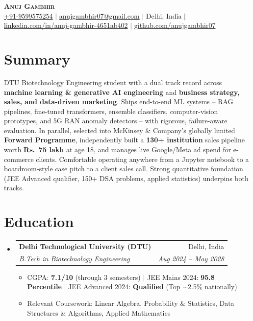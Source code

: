 \documentclass[letterpaper,10.5pt]{article}
\makeatletter
\newcommand{\resumeItem}[1]{
  \item\small{#1 \vspace{-2pt}}
}
\newcommand{\resumeSubheading}[4]{
  \vspace{-2pt}\item
    \begin{tabular*}{0.97\textwidth}[t]{l@{\extracolsep{\fill}}r}
      \textbf{#1} & \small #2 \\
      \textit{\small#3} & \textit{\small #4} \\
    \end{tabular*}\vspace{-5pt}
}
\newcommand{\resumeSubHeadingListStart}{\begin{itemize}[leftmargin=0.12in, label={}]}
\newcommand{\resumeSubHeadingListEnd}{\end{itemize}}
\newcommand{\resumeItemListStart}{\begin{itemize}[leftmargin=0.18in]}
\newcommand{\resumeItemListEnd}{\end{itemize}\vspace{-4pt}}
\makeatother
\begin{document}
\begin{center}
    {\LARGE \scshape \textbf{Anuj Gambhir}} \\ \vspace{3pt}
    \small
    \href{tel:9599575254}{+91-9599575254} $|$
    \href{mailto:anujgambhir07@gmail.com}{anujgambhir07@gmail.com} $|$
    Delhi, India $|$
    \href{https://www.linkedin.com/in/anuj-gambhir-4651ab402/}{linkedin.com/in/anuj-gambhir-4651ab402} $|$
    \href{https://www.github.com/anujgambhir07}{github.com/anujgambhir07}
\end{center}
\vspace{-12pt}

\section{Summary}
\small{DTU Biotechnology Engineering student with a dual track record across \textbf{machine learning \& generative AI engineering} and \textbf{business strategy, sales, and data-driven marketing}. Ships end-to-end ML systems -- RAG pipelines, fine-tuned transformers, ensemble classifiers, computer-vision prototypes, and 5G RAN anomaly detectors -- with rigorous, failure-aware evaluation. In parallel, selected into McKinsey \& Company's globally limited \textbf{Forward Programme}, independently built a \textbf{130+ institution} sales pipeline worth \textbf{Rs.\ 75 lakh} at age 18, and manages live Google/Meta ad spend for e-commerce clients. Comfortable operating anywhere from a Jupyter notebook to a boardroom-style case pitch to a client sales call. Strong quantitative foundation (JEE Advanced qualifier, 150+ DSA problems, applied statistics) underpins both tracks.}
\vspace{-4pt}

\section{Education}
\resumeSubHeadingListStart
  \resumeSubheading
    {Delhi Technological University (DTU)}{Delhi, India}
    {B.Tech in Biotechnology Engineering}{Aug 2024 -- May 2028}
    \resumeItemListStart
      \resumeItem{CGPA: \textbf{7.1/10} (through 3 semesters) $|$ JEE Mains 2024: \textbf{95.8 Percentile} $|$ JEE Advanced 2024: \textbf{Qualified} (Top $\sim$2.5\% nationally)}
      \resumeItem{Relevant Coursework: Linear Algebra, Probability \& Statistics, Data Structures \& Algorithms, Applied Mathematics}
    \resumeItemListEnd
\resumeSubHeadingListEnd
\vspace{-6pt}
\end{document}
